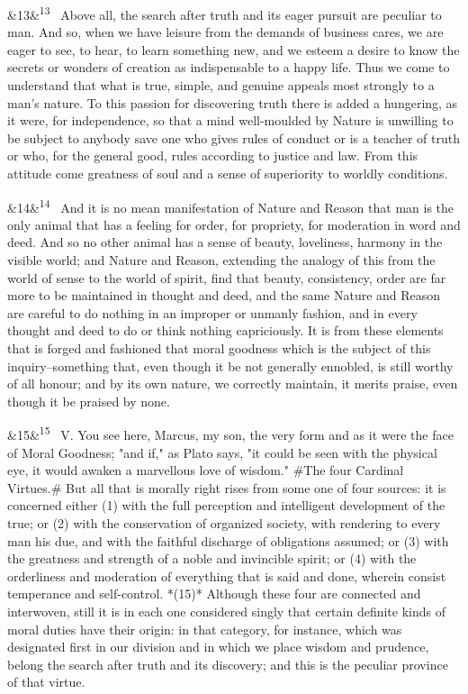 \documentclass[12pt]{article}
\newcommand{\para}[1][]{\par\noindent\ifx&#1&\else\textsuperscript{\footnotesize #1}~\fi}
\begin{document}
\para[13] Above all, the search after truth and its eager pursuit are peculiar to man. And so, when we have leisure from the demands of business cares, we are eager to see, to hear, to learn something new, and we esteem a desire to know the secrets or wonders of creation as indispensable to a happy life. Thus we come to understand that what is true, simple, and genuine appeals most strongly to a man's nature. To this passion for discovering truth there is added a hungering, as it were, for independence, so that a mind well-moulded by Nature is unwilling to be subject to anybody save one who gives rules of conduct or is a teacher of truth or who, for the general good, rules according to justice and law. From this attitude come greatness of soul and a sense of superiority to worldly conditions.

\para[14] And it is no mean manifestation of Nature and Reason that man is the only animal that has a feeling for order, for propriety, for moderation in word and deed. And so no other animal has a sense of beauty, loveliness, harmony in the visible world; and Nature and Reason, extending the analogy of this from the world of sense to the world of spirit, find that beauty, consistency, order are far more to be maintained in thought and deed, and the same Nature and Reason are careful to do nothing in an improper or unmanly fashion, and in every thought and deed to do or think nothing capriciously. It is from these elements that is forged and fashioned that moral goodness which is the subject of this inquiry--something that, even though it be not generally ennobled, is still worthy of all honour; and by its own nature, we correctly maintain, it merits praise, even though it be praised by none.

\para[15] V. You see here, Marcus, my son, the very form and as it were the face of Moral Goodness; "and if," as Plato says, "it could be seen with the physical eye, it would awaken a marvellous love of wisdom." \#The four Cardinal Virtues.\# But all that is morally right rises from some one of four sources: it is concerned either (1) with the full perception and intelligent development of the true; or (2) with the conservation of organized society, with rendering to every man his due, and with the faithful discharge of obligations assumed; or (3) with the greatness and strength of a noble and invincible spirit; or (4) with the orderliness and moderation of everything that is said and done, wherein consist temperance and self-control. *(15)* Although these four are connected and interwoven, still it is in each one considered singly that certain definite kinds of moral duties have their origin: in that category, for instance, which was designated first in our division and in which we place wisdom and prudence, belong the search after truth and its discovery; and this is the peculiar province of that virtue.
\end{document}
